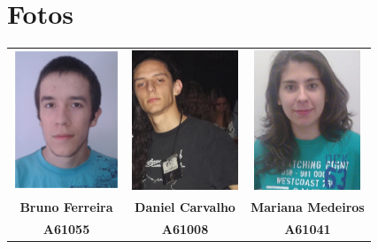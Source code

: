 \documentclass[a5paper,twocolumn, 11pt]{article}
\begin{document}
\section{Fotos}
\begin{center}
    \begin{tabular}{ccc}
        \includegraphics[width=90pt]{bruno.png}&
        \includegraphics[width=90pt]{daniel.png}&
        \includegraphics[width=90pt]{mariana.png}\\
        
        \small{\textbf{Bruno Ferreira}}&
        \small{\textbf{Daniel Carvalho}}&
        \small{\textbf{Mariana Medeiros}}\\
        \small{\textbf{A61055}}&
        \small{\textbf{A61008}}&
        \small{\textbf{A61041}}\\
    \end{tabular}
\end{center}
\end{document}
